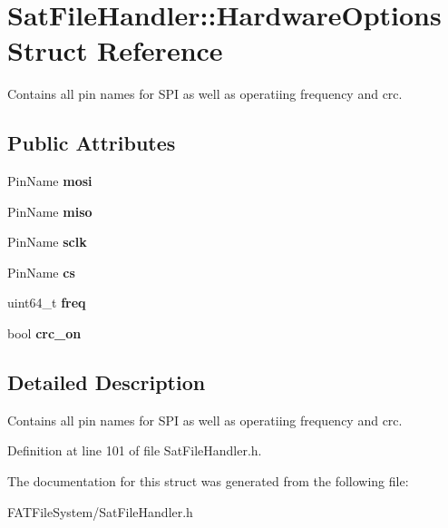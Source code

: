 \hypertarget{struct_sat_file_handler_1_1_hardware_options}{}\section{Sat\+File\+Handler\+::Hardware\+Options Struct Reference}
\label{struct_sat_file_handler_1_1_hardware_options}


Contains all pin names for S\+PI as well as operatiing frequency and crc.  


\subsection*{Public Attributes}
\begin{DoxyCompactItemize}
\item 
\mbox{\label{struct_sat_file_handler_1_1_hardware_options_a24f9b6e0e3feccddd8ad532d2a425509}} 
Pin\+Name {\bfseries mosi}
\item 
\mbox{\label{struct_sat_file_handler_1_1_hardware_options_a9a9f76f783238b3ca58d19dfaa9d7341}} 
Pin\+Name {\bfseries miso}
\item 
\mbox{\label{struct_sat_file_handler_1_1_hardware_options_a1b38af054a75cf67602d946d3e622d8f}} 
Pin\+Name {\bfseries sclk}
\item 
\mbox{\label{struct_sat_file_handler_1_1_hardware_options_ab0856adadf54f443a3b866b97625bf79}} 
Pin\+Name {\bfseries cs}
\item 
\mbox{\label{struct_sat_file_handler_1_1_hardware_options_aaa71c511b26c4ae1eb60f6e3af9ec2bb}} 
uint64\+\_\+t {\bfseries freq}
\item 
\mbox{\label{struct_sat_file_handler_1_1_hardware_options_ae420e371f75eba2173affb045adb747f}} 
bool {\bfseries crc\+\_\+on}
\end{DoxyCompactItemize}


\subsection{Detailed Description}
Contains all pin names for S\+PI as well as operatiing frequency and crc. 



Definition at line 101 of file Sat\+File\+Handler.\+h.



The documentation for this struct was generated from the following file\+:\begin{DoxyCompactItemize}
\item 
F\+A\+T\+File\+System/Sat\+File\+Handler.\+h\end{DoxyCompactItemize}
